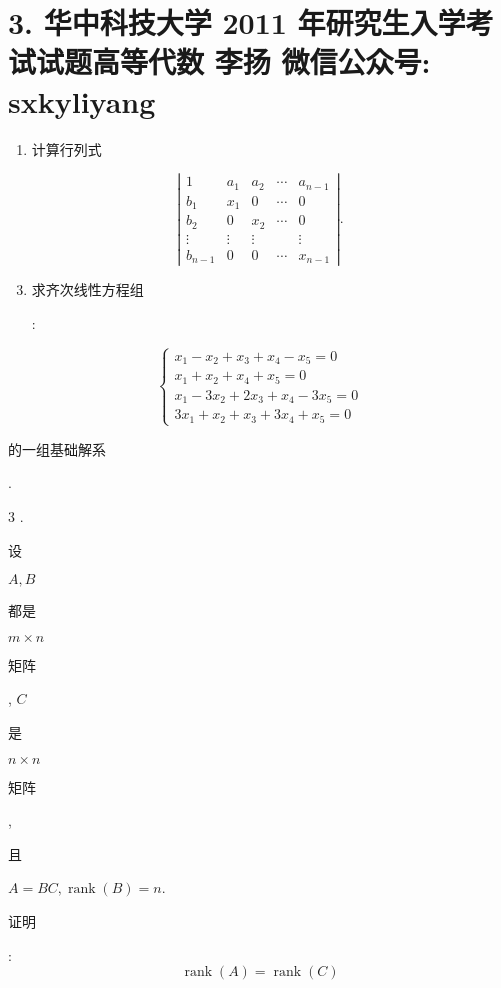 \documentclass[10pt]{article}
\begin{document}
\section{3. 华中科技大学 2011 年研究生入学考试试题高等代数 
 李扬 
 微信公众号: sxkyliyang}
\begin{enumerate}
  \item \begin{CJK}{UTF8}{mj}计算行列式\end{CJK}
\end{enumerate}
$$
\left|\begin{array}{ccccc}
1 & a_{1} & a_{2} & \cdots & a_{n-1} \\
b_{1} & x_{1} & 0 & \cdots & 0 \\
b_{2} & 0 & x_{2} & \cdots & 0 \\
\vdots & \vdots & \vdots & & \vdots \\
b_{n-1} & 0 & 0 & \cdots & x_{n-1}
\end{array}\right| .
$$

\begin{enumerate}
  \setcounter{enumi}{2}
  \item \begin{CJK}{UTF8}{mj}求齐次线性方程组\end{CJK}:
\end{enumerate}
$$
\left\{\begin{array}{l}
x_{1}-x_{2}+x_{3}+x_{4}-x_{5}=0 \\
x_{1}+x_{2}+x_{4}+x_{5}=0 \\
x_{1}-3 x_{2}+2 x_{3}+x_{4}-3 x_{5}=0 \\
3 x_{1}+x_{2}+x_{3}+3 x_{4}+x_{5}=0
\end{array}\right.
$$
\begin{CJK}{UTF8}{mj}的一组基础解系\end{CJK}.

3 . \begin{CJK}{UTF8}{mj}设\end{CJK} $A, B$ \begin{CJK}{UTF8}{mj}都是\end{CJK} $m \times n$ \begin{CJK}{UTF8}{mj}矩阵\end{CJK}, $C$ \begin{CJK}{UTF8}{mj}是\end{CJK} $n \times n$ \begin{CJK}{UTF8}{mj}矩阵\end{CJK}, \begin{CJK}{UTF8}{mj}且\end{CJK} $A=B C, \operatorname{rank}(B)=n$. \begin{CJK}{UTF8}{mj}证明\end{CJK}:
$$
\operatorname{rank}(A)=\operatorname{rank}(C)
$$
\end{document}
